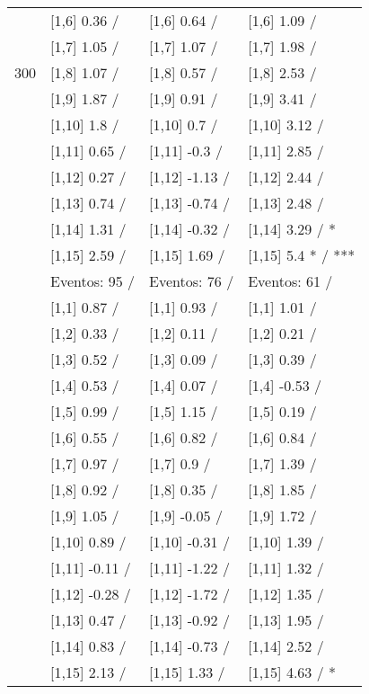 \begin{table}
\begin{tabular}[t]{llll}
 & {}[1,6] 0.36  / & {}[1,6] 0.64  / & {}[1,6] 1.09  /\\
 & {}[1,7] 1.05  / & {}[1,7] 1.07  / & {}[1,7] 1.98  /\\
300 & {}[1,8] 1.07  / & {}[1,8] 0.57  / & {}[1,8] 2.53  /\\
\addlinespace
 & {}[1,9] 1.87  / & {}[1,9] 0.91  / & {}[1,9] 3.41  /\\
 & {}[1,10] 1.8  / & {}[1,10] 0.7  / & {}[1,10] 3.12  /\\
 & {}[1,11] 0.65  / & {}[1,11] -0.3  / & {}[1,11] 2.85  /\\
 & {}[1,12] 0.27  / & {}[1,12] -1.13  / & {}[1,12] 2.44  /\\
 & {}[1,13] 0.74  / & {}[1,13] -0.74  / & {}[1,13] 2.48  /\\
\addlinespace
 & {}[1,14] 1.31  / & {}[1,14] -0.32  / & {}[1,14] 3.29  / *\\
 & {}[1,15] 2.59  / & {}[1,15] 1.69  / & {}[1,15] 5.4 * / ***\\
 & Eventos:  95 / & Eventos:  76 / & Eventos:  61 /\\
 & {}[1,1] 0.87  / & {}[1,1] 0.93  / & {}[1,1] 1.01  /\\
 & {}[1,2] 0.33  / & {}[1,2] 0.11  / & {}[1,2] 0.21  /\\
\addlinespace
 & {}[1,3] 0.52  / & {}[1,3] 0.09  / & {}[1,3] 0.39  /\\
 & {}[1,4] 0.53  / & {}[1,4] 0.07  / & {}[1,4] -0.53  /\\
 & {}[1,5] 0.99  / & {}[1,5] 1.15  / & {}[1,5] 0.19  /\\
 & {}[1,6] 0.55  / & {}[1,6] 0.82  / & {}[1,6] 0.84  /\\
 & {}[1,7] 0.97  / & {}[1,7] 0.9  / & {}[1,7] 1.39  /\\
\addlinespace
500 & {}[1,8] 0.92  / & {}[1,8] 0.35  / & {}[1,8] 1.85  /\\
 & {}[1,9] 1.05  / & {}[1,9] -0.05  / & {}[1,9] 1.72  /\\
 & {}[1,10] 0.89  / & {}[1,10] -0.31  / & {}[1,10] 1.39  /\\
 & {}[1,11] -0.11  / & {}[1,11] -1.22  / & {}[1,11] 1.32  /\\
 & {}[1,12] -0.28  / & {}[1,12] -1.72  / & {}[1,12] 1.35  /\\
\addlinespace
 & {}[1,13] 0.47  / & {}[1,13] -0.92  / & {}[1,13] 1.95  /\\
 & {}[1,14] 0.83  / & {}[1,14] -0.73  / & {}[1,14] 2.52  /\\
 & {}[1,15] 2.13  / & {}[1,15] 1.33  / & {}[1,15] 4.63  / *\\
\bottomrule
\end{tabular}
\end{table}
